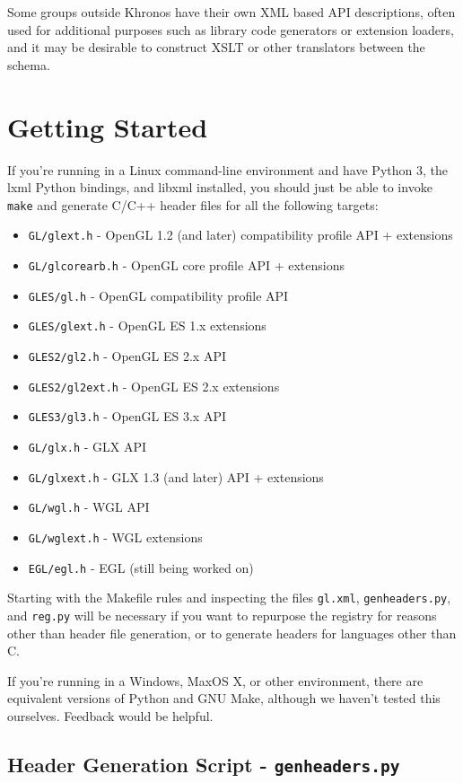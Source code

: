 \documentclass{article}
\def\code#1{{\tt #1}}
\begin{document}
Some groups outside Khronos have their own XML based API descriptions,
often used for additional purposes such as library code generators or
extension loaders, and it may be desirable to construct XSLT or other
translators between the schema.


\section{Getting Started}

If you're running in a Linux command-line environment and have Python 3,
the lxml Python bindings, and libxml installed, you should just be able
to invoke \code{make} and generate C/C++ header files for all the following
targets:

\begin{itemize}
\item \code{GL/glext.h} - OpenGL 1.2 (and later) compatibility profile
      API + extensions
\item \code{GL/glcorearb.h} - OpenGL core profile API + extensions
\item \code{GLES/gl.h} - OpenGL compatibility profile API
\item \code{GLES/glext.h} - OpenGL ES 1.x extensions
\item \code{GLES2/gl2.h} - OpenGL ES 2.x API
\item \code{GLES2/gl2ext.h} - OpenGL ES 2.x extensions
\item \code{GLES3/gl3.h} - OpenGL ES 3.x API
\item \code{GL/glx.h} - GLX API
\item \code{GL/glxext.h} - GLX 1.3 (and later) API + extensions
\item \code{GL/wgl.h} - WGL API
\item \code{GL/wglext.h} - WGL extensions
\item \code{EGL/egl.h} - EGL (still being worked on)
\end{itemize}

Starting with the Makefile rules and inspecting the files \code{gl.xml},
\code{genheaders.py}, and \code{reg.py} will be necessary if you want to
repurpose the registry for reasons other than header file generation, or
to generate headers for languages other than C.

If you're running in a Windows, MaxOS X, or other environment, there are
equivalent versions of Python and GNU Make, although we haven't tested
this ourselves. Feedback would be helpful.

\subsection{Header Generation Script - \code{genheaders.py}}
\end{document}
